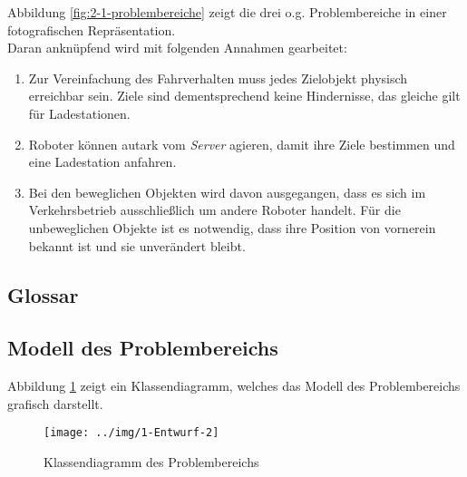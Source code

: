 		Abbildung \ref{fig:2-1-problembereiche} zeigt die drei o.g. Problembereiche in einer fotografischen Repräsentation.\\


		Daran anknüpfend wird mit folgenden Annahmen gearbeitet:

		\begin{enumerate}
		\item
			Zur Vereinfachung des Fahrverhalten muss jedes Zielobjekt physisch
			erreichbar sein. Ziele sind dementsprechend keine Hindernisse, das
			gleiche gilt für Ladestationen.
		\item
			Roboter können autark vom \emph{Server} agieren, damit ihre Ziele
			bestimmen und eine Ladestation anfahren.
		\item
			Bei den beweglichen Objekten wird davon ausgegangen, dass es sich im
			Verkehrsbetrieb ausschließlich um andere Roboter handelt. Für die
			unbeweglichen Objekte ist es notwendig, dass ihre Position von
			vornerein bekannt ist und sie unverändert bleibt.
		\end{enumerate}

		\subsection{Glossar}


		
		
		
		\subsection{Modell des Problembereichs}
		Abbildung \ref{fig:2-3-modell-problembereich} zeigt ein Klassendiagramm, welches das Modell des Problembereichs grafisch darstellt.
		\begin{figure}[H]
			\centering
			\texttt{[image: ../img/1-Entwurf-2]}
			\caption{Klassendiagramm des Problembereichs}
			\label{fig:2-3-modell-problembereich}
		\end{figure}

